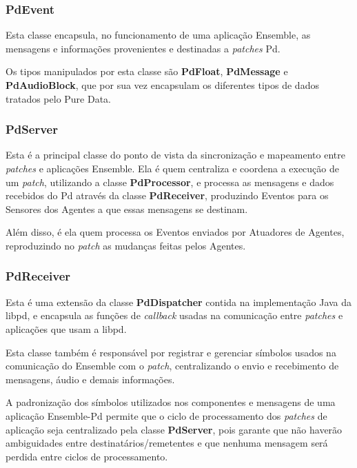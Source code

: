 \documentclass[a4paper, 11pt, twoside]{article}
\begin{document}
\begin{multicols}{2}
\subsubsection{PdEvent}

Esta classe encapsula, no funcionamento de uma aplicação Ensemble,
as mensagens e informações provenientes e destinadas a \textit{patches} Pd.

Os tipos manipulados por esta classe são \textbf{PdFloat}, \textbf{PdMessage} e
\textbf{PdAudioBlock}, que por sua vez encapsulam os diferentes tipos de dados
tratados pelo Pure Data.

\subsubsection{PdServer}

Esta é a principal classe do ponto de vista da sincronização 
e mapeamento entre \textit{patches} e aplicações Ensemble.
Ela é quem centraliza e coordena a execução de um \textit{patch}, utilizando
a classe \textbf{PdProcessor}, e processa as mensagens e dados recebidos do Pd 
através da classe \textbf{PdReceiver}, produzindo Eventos para os Sensores 
dos Agentes a que essas mensagens se destinam.

Além disso, é ela quem processa os Eventos enviados por Atuadores de Agentes,
reproduzindo no \textit{patch} as mudanças feitas pelos Agentes.

\subsubsection{PdReceiver}

Esta é uma extensão da classe \textbf{PdDispatcher} contida na implementação
Java da libpd, e encapsula as funções de \textit{callback} usadas na
comunicação entre \textit{patches} e aplicações que usam a libpd.

Esta classe também é responsável por registrar e gerenciar símbolos
usados na comunicação do Ensemble com o \textit{patch}, centralizando
o envio e recebimento de mensagens, áudio e demais informações.

A padronização dos símbolos utilizados nos componentes e mensagens
de uma aplicação Ensemble-Pd permite que o ciclo de processamento
dos \textit{patches} de aplicação seja centralizado pela classe
\textbf{PdServer}, pois garante que não haverão ambiguidades entre
destinatários/remetentes e que nenhuma mensagem será perdida
entre ciclos de processamento.


\end{multicols}
\end{document}
